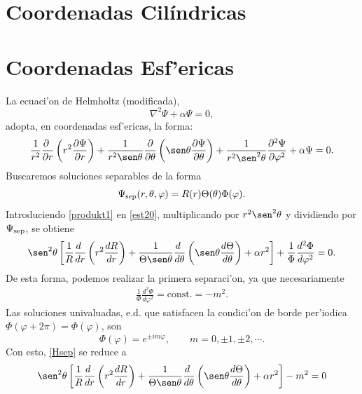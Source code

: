 \section{Coordenadas Cil\'indricas}
\section{Coordenadas Esf'ericas}
La ecuaci'on de Helmholtz (modificada),
\begin{equation}
\nabla^2\Psi+\alpha\Psi=0,
\end{equation}
adopta, en coordenadas esf'ericas, la forma:
\begin{equation}
\frac{1}{r^2}\frac{\partial\ }{\partial r}\left(r^2\frac{\partial\Psi}{\partial r}\right)   
+\frac{1}{r^2\sen\theta}\frac{\partial}{\partial\theta}\left(\sen\theta\frac{
\partial\Psi}{\partial\theta}\right) + \frac{1}{r^2\sen^2  \theta}
\frac{\partial^2\Psi}{\partial \varphi^2}  +\alpha\Psi= 0.\label{est20}
 \end{equation}
Buscaremos soluciones separables de la forma 
 \begin{equation}\label{produkt1}
  \Psi_{\rm sep}(r,\theta,\varphi) = R(r)\Theta(\theta)\Phi(\varphi).
 \end{equation}
 Introduciendo \eqref{produkt1} en \eqref{est20}, multiplicando por $r^2\sen^2\theta$ y dividiendo por $\Psi_{\rm sep}$, se obtiene
\begin{equation}\label{Hsep}
\sen^2\theta\left[\frac{1}{R}\frac{d\ }{dr}\left(r^2\frac{dR}{dr}\right) +
\frac{1}{\Theta\sen\theta}\frac{d\ }{d\theta}\left(\sen\theta\frac{
d\Theta}{d\theta}\right) +\alpha r^2\right]+ \frac{1}{\Phi}\frac{d^2 \Phi}{d\varphi^2} = 0.
 \end{equation}
De esta forma, podemos realizar la primera separaci'on, ya que necesariamente
\begin{eqnarray}
\frac{1}{\Phi} \frac{d^2\Phi}{d\varphi^2} = \text{const.} = -m^2. \end{eqnarray}\label{loes1}
Las soluciones univaluadas, e.d. que satisfacen la condici'on de borde per'iodica $\Phi(\varphi+2\pi)=\Phi(\varphi)$, son
\begin{equation}\label{Phim}
\Phi (\varphi) = e^{\pm im\varphi}, \qquad m=0,\pm 1,\pm 2, \cdots .
\end{equation}
Con esto, \eqref{Hsep} se reduce a
\begin{equation}
\sen^2\theta\left[\frac{1}{R}\frac{d\ }{dr}\left(r^2\frac{dR}{dr}\right) +
\frac{1}{\Theta\sen\theta}\frac{d\ }{d\theta}\left(\sen\theta\frac{
d\Theta}{d\theta}\right) +\alpha r^2\right]-m^2 = 0
 \end{equation}
